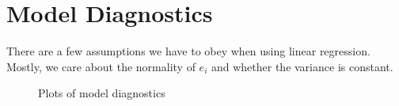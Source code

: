 \documentclass[a4paper,11pt,onecolumn,twoside]{article}
\begin{document}
\section{Model Diagnostics}
There are a few assumptions we have to obey when using linear regression. Mostly, we care about the normality of $e_i$ and whether the variance is constant.
\begin{figure}[htbp]
	\centering
	\caption{Plots of model diagnostics}
\end{figure}
\end{document}
